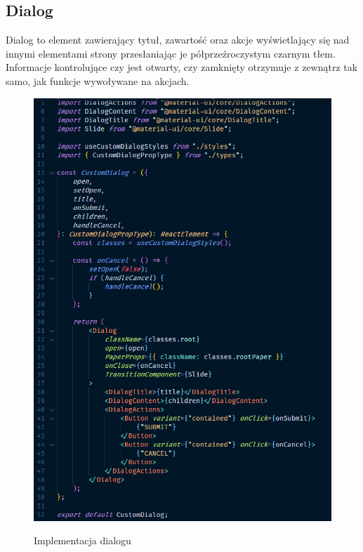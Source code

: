 \documentclass[a4paper,11pt]{report}
\begin{document}
\subsection{Dialog}
\label{subsec:dialog}
Dialog to element zawierający tytuł, zawartość oraz akcje wyświetlający się nad innymi
 elementami strony przesłaniając je półprzeźroczystym czarnym tłem.
Informacje kontrolujące czy jest otwarty, czy zamknięty otrzymuje z zewnątrz tak samo, jak funkcje wywoływane na akcjach.
\begin{figure}[H]
	\centering
	\includegraphics[scale=0.5]{implementacja/frontend/dialog}\\
	\caption{Implementacja dialogu}
	\label{fig:dialog}
\end{figure}
\end{document}
